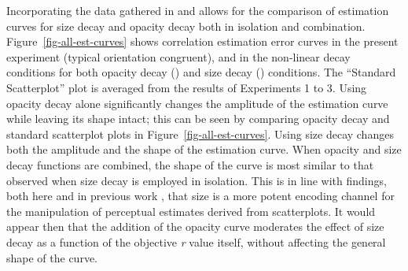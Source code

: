 \documentclass[../main.tex]{subfiles}
\begin{document}
Incorporating the data gathered in  and
 allows for the comparison of estimation
curves for size decay and opacity decay both in isolation and
combination. Figure~\ref{fig-all-est-curves} shows correlation
estimation error curves in the present experiment (typical orientation
congruent), and in the non-linear decay conditions for both opacity
decay () and size decay
() conditions. The ``Standard Scatterplot''
plot is averaged from the results of Experiments 1 to 3. Using opacity
decay alone significantly changes the amplitude of the estimation curve
while leaving its shape intact; this can be seen by comparing opacity
decay and standard scatterplot plots in Figure~\ref{fig-all-est-curves}.
Using size decay changes both the amplitude and the shape of the
estimation curve. When opacity and size decay functions are combined,
the shape of the curve is most similar to that observed when size decay
is employed in isolation. This is in line with findings, both here and
in previous work \cite{hong_2022}, that size is a more potent encoding
channel for the manipulation of perceptual estimates derived from
scatterplots. It would appear then that the addition of the opacity
curve moderates the effect of size decay as a function of the objective
\emph{r} value itself, without affecting the general shape of the curve.
\end{document}
